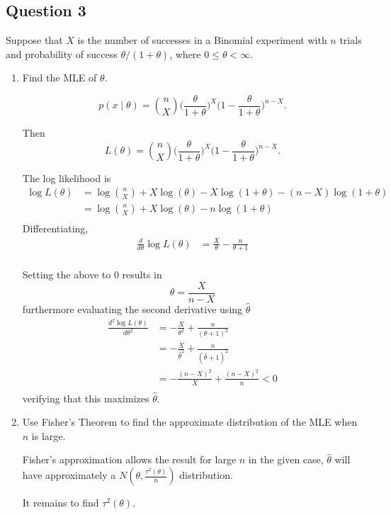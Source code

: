 \documentclass{tufte-book}
\theoremstyle{mytheoremstyle}
\theoremstyle{mylemstyle}
\theoremstyle{mydefstyle}
\begin{document}
\subsection{Question 3}
Suppose that $X$ is the number of successes in a Binomial experiment with $n$ trials and probability of success $\theta/(1+\theta)$, where $0\leq \theta < \infty$.

\begin{enumerate}
\item Find the MLE of $\theta$.

\[p(x\mid \theta) = \binom{n}{X}\Big(\frac{\theta}{1+\theta}\Big)^X\big(1-\frac{\theta}{1+\theta} \Big)^{n-X}. \]

Then
\[L(\theta) = \binom{n}{X}\Big(\frac{\theta}{1+\theta}\Big)^X\big(1-\frac{\theta}{1+\theta} \Big)^{n-X}. \]

The log likelihood is
\begin{align*}
\log L(\theta) &= \log\binom{n}{X} + X\log(\theta) - X\log(1+\theta) - (n-X)\log(1+\theta)\\
&= \log\binom{n}{X} + X\log(\theta) - n\log(1+\theta) \\
\end{align*}
Differentiating,
\begin{align*}
\frac{d}{d\theta} \log L(\theta) &= \frac{X}{\theta} - \frac{n}{\theta+1}\\
\end{align*}

Setting the above to $0$ results in
\[ \hat{\theta} = \frac{X}{n-X} \]
furthermore evaluating the second derivative using $\hat{\theta}$
\begin{align*}
\frac{d^2 \log L(\theta)}{d\theta^2} &= -\frac{X}{\theta^2} + \frac{n}{(\theta+1)^2}\\
&= -\frac{X}{\hat{\theta}^2} + \frac{n}{(\hat{\theta}+1)^2}\\
&= -\frac{(n - X)^2}{X} + \frac{(n-X)^2}{n} < 0\\
\end{align*}
verifying that this maximizes $\hat{\theta}$.

\item Use Fisher's Theorem to find the approximate distribution of the MLE when $n$ is large.

Fisher's approximation allows the result for large $n$ in the given case, $\hat{\theta}$ will have approximately a $N(\theta, \frac{\tau^2(\theta)}{n})$ distribution.

It remains to find $\tau^2(\theta)$.


\end{enumerate}
\end{document}
